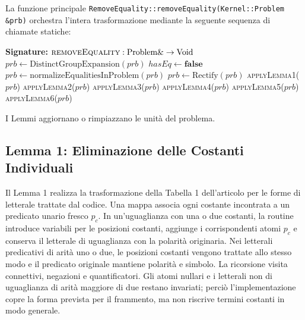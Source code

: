 La funzione principale \texttt{RemoveEquality::removeEquality(Kernel::Problem \&prb)} orchestra l'intera trasformazione mediante la seguente sequenza di chiamate statiche:

\begin{algorithm}[H]
\caption{FO2 Equality Removal Main Procedure}
\label{alg:remove_equality}
\begin{algorithmic}[1]
    \Statex \textbf{Signature:} $\textsc{removeEquality}: \text{Problem}\& \to \text{Void}$
            \State $prb \leftarrow \text{DistinctGroupExpansion}(prb)$
        \EndIf
        \State $hasEq \leftarrow \textbf{false}$
         \State \Return \EndIf
         \State \Return \EndIf
        \State $prb \leftarrow \text{normalizeEqualitiesInProblem}(prb)$
        \State $prb \leftarrow \text{Rectify}(prb)$
        \State \textsc{applyLemma1}($prb$)
        \State \textsc{applyLemma2}($prb$)
        \State \textsc{applyLemma3}($prb$)
        \State \textsc{applyLemma4}($prb$)
        \State \textsc{applyLemma5}($prb$)
        \State \textsc{applyLemma6}($prb$)
    \EndFunction
\end{algorithmic}
\end{algorithm}
I Lemmi aggiornano o rimpiazzano le unità del problema.

\subsection{Lemma 1: Eliminazione delle Costanti Individuali}
\label{subsec:lemma1_impl}

Il Lemma 1 realizza la trasformazione della Tabella 1 dell'articolo per le forme di letterale trattate dal codice. Una mappa associa ogni costante incontrata a un predicato unario fresco $p_c$. In un'uguaglianza con una o due costanti, la routine introduce variabili per le posizioni costanti, aggiunge i corrispondenti atomi $p_c$ e conserva il letterale di uguaglianza con la polarità originaria. Nei letterali predicativi di arità uno o due, le posizioni costanti vengono trattate allo stesso modo e il predicato originale mantiene polarità e simbolo. La ricorsione visita connettivi, negazioni e quantificatori. Gli atomi nullari e i letterali non di uguaglianza di arità maggiore di due restano invariati; perciò l'implementazione copre la forma prevista per il frammento, ma non riscrive termini costanti in modo generale.

